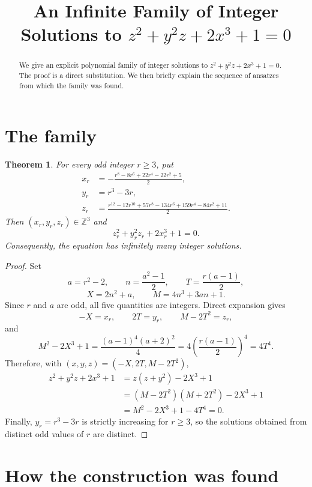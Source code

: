 \documentclass[11pt]{article}
\title{An Infinite Family of Integer Solutions to
\texorpdfstring{$z^2+y^2z+2x^3+1=0$}{z^2+y^2z+2x^3+1=0}}
\author{}
\date{}
\newtheorem{theorem}{Theorem}
\begin{document}
\maketitle
\vspace{-1.2em}

\begin{abstract}
We give an explicit polynomial family of integer solutions to
\(z^2+y^2z+2x^3+1=0\).  The proof is a direct substitution.  We then
briefly explain the sequence of ansatzes from which the family was found.
\end{abstract}

\section{The family}

\begin{theorem}\label{thm:main}
For every odd integer \(r\geq 3\), put
\[
\begin{aligned}
 x_r&=-\frac{r^8-8r^6+22r^4-22r^2+5}{2},\\
 y_r&=r^3-3r,\\
 z_r&=\frac{r^{12}-12r^{10}+57r^8-134r^6
              +159r^4-84r^2+11}{2}.
\end{aligned}
\]
Then \((x_r,y_r,z_r)\in\mathbb Z^3\) and
\[
        z_r^2+y_r^2z_r+2x_r^3+1=0.
\]
Consequently, the equation has infinitely many integer solutions.
\end{theorem}

\begin{proof}
Set
\[
 a=r^2-2,\qquad n=\frac{a^2-1}{2},\qquad
 T=\frac{r(a-1)}2,
\]
\[
 X=2n^2+a,\qquad M=4n^3+3an+1.
\]
Since \(r\) and \(a\) are odd, all five quantities are integers.  Direct
expansion gives
\[
 -X=x_r,\qquad 2T=y_r,\qquad M-2T^2=z_r,
\]
and
\[
 M^2-2X^3+1
 =\frac{(a-1)^4(a+2)^2}{4}
 =4\left(\frac{r(a-1)}2\right)^4
 =4T^4.
\]
Therefore, with \((x,y,z)=(-X,2T,M-2T^2)\),
\begin{align*}
 z^2+y^2z+2x^3+1
 &=z(z+y^2)-2X^3+1\\
 &=(M-2T^2)(M+2T^2)-2X^3+1\\
 &=M^2-2X^3+1-4T^4=0.
\end{align*}
Finally, \(y_r=r^3-3r\) is strictly increasing for \(r\geq3\), so the
solutions obtained from distinct odd values of \(r\) are distinct.
\end{proof}

\section{How the construction was found}\label{sec:discovery}
\end{document}
